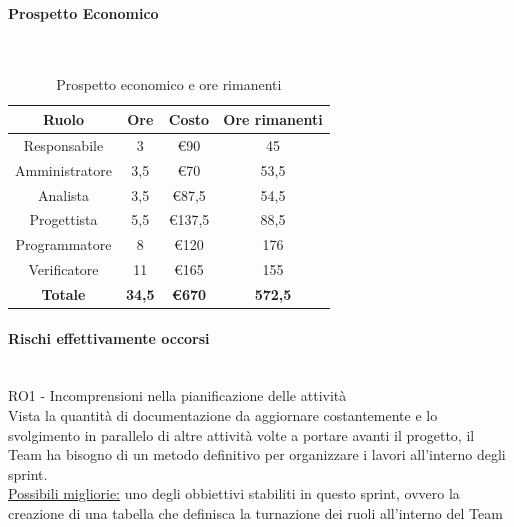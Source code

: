 \documentclass{article}
\begin{document}
                \paragraph{Prospetto Economico}\mbox{}\\
                \begin{table}[H]
                    \centering
                    \begin{tabular}{|c|c|c|c|}
                    \hline
                    \textbf{Ruolo}  & \textbf{Ore}  & \textbf{Costo} & \textbf{Ore rimanenti} \\ \hline
                    Responsabile    & 3             & €90            & 45                     \\ \hline
                    Amministratore  & 3,5           & €70            & 53,5                   \\ \hline
                    Analista        & 3,5           & €87,5          & 54,5                   \\ \hline
                    Progettista     & 5,5           & €137,5         & 88,5                   \\ \hline
                    Programmatore   & 8            & €120           & 176                    \\ \hline
                    Verificatore    & 11            & €165           & 155                    \\ \hline
                    \textbf{Totale} & \textbf{34,5} & \textbf{\euro670}   & \textbf{572,5}         \\ \hline
                    \end{tabular}
                    \caption{Prospetto economico e ore rimanenti}
                \end{table}


                \paragraph{Rischi effettivamente occorsi}\mbox{}\\
                RO1 - Incomprensioni nella pianificazione delle attività \\
                Vista la quantità di documentazione da aggiornare costantemente e lo svolgimento in parallelo di altre attività volte a portare avanti il progetto, il Team ha bisogno di un metodo definitivo per organizzare i lavori all’interno degli sprint. \\
                \underline{Possibili migliorie:} uno degli obbiettivi stabiliti in questo sprint, ovvero la creazione di una tabella che definisca la turnazione dei ruoli all’interno del Team
\end{document}
